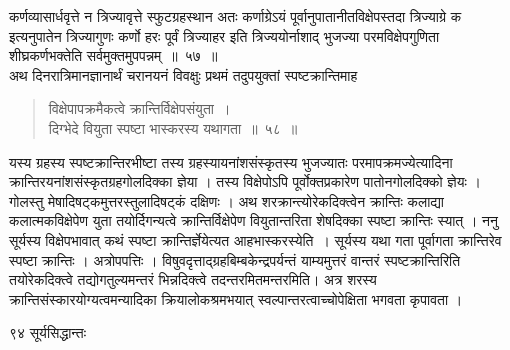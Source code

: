 \documentclass[11pt, openany]{book}
\begin{document}
\begin{sloppypar}
\noindent कर्णव्यासार्धवृत्ते न त्रिज्यावृत्ते स्फुटग्रहस्थान अतः कर्णाग्रेऽयं पूर्वानुपातानीतविक्षेपस्तदा त्रिज्याग्रे क इत्यनुपातेन त्रिज्यागुणः कर्णो हरः पूर्वं त्रिज्याहर इति त्रिज्ययोर्नाशाद् भुजज्या परमविक्षेपगुणिता शीघ्रकर्णभक्तेति सर्वमुक्तमुपपन्नम्~॥~५७~॥\\
\noindent अथ दिनरात्रिमानज्ञानार्थं चरानयनं विवक्षुः प्रथमं तदुपयुक्तां स्पष्टक्रान्तिमाह\textendash
\end{sloppypar}
\begin{quote}

{\ssi विक्षेपापक्रमैकत्वे क्रान्तिर्विक्षेपसंयुता~।\\
दिग्भेदे वियुता स्पष्टा भास्करस्य यथागता~॥~५८~॥}
\end{quote}
\begin{sloppypar}
यस्य ग्रहस्य स्पष्टक्रान्तिरभीष्टा तस्य ग्रहस्यायनांशसंस्कृतस्य भुजज्यातः परमापक्रमज्येत्यादिना क्रान्तिरयनांशसंस्कृतग्रहगोलदिक्का ज्ञेया । तस्य विक्षेपोऽपि पूर्वोक्तप्रकारेण पातोनगोलदिक्को ज्ञेयः । गोलस्तु मेषादिषट्कमुत्तरस्तुलादिषट्कं दक्षिणः । अथ शरक्रान्त्योरेकदिक्त्वेन क्रान्तिः कलाद्या कलात्मकविक्षेपेण युता तयोर्दिगन्यत्वे क्रान्तिर्विक्षेपेण वियुतान्तरिता शेषदिक्का स्पष्टा क्रान्तिः स्यात् । ननु सूर्यस्य विक्षेपभावात् कथं स्पष्टा क्रान्तिर्ज्ञेयेत्यत आह\textendash भास्करस्येति~। सूर्यस्य यथा गता पूर्वागता क्रान्तिरेव स्पष्टा क्रान्तिः । अत्रोपपत्तिः । विषुवदृत्ताद्ग्रहबिम्बकेन्द्रपर्यन्तं याम्यमुत्तरं वान्तरं स्पष्टक्रान्तिरिति तयोरेकदिक्त्वे तद्योगतुल्यमन्तरं भिन्नदिक्त्वे तदन्तरमितमन्तरमिति। अत्र शरस्य क्रान्तिसंस्कारयोग्यत्वमन्यादिका क्रियालोकश्रमभयात् स्वल्पान्तरत्वाच्चोपेक्षिता भगवता कृपावता ।
\end{sloppypar}


\newpage


\noindent ९४ \hspace{4cm} सूर्यसिद्धान्तः
\vspace{1cm}
\end{document}
